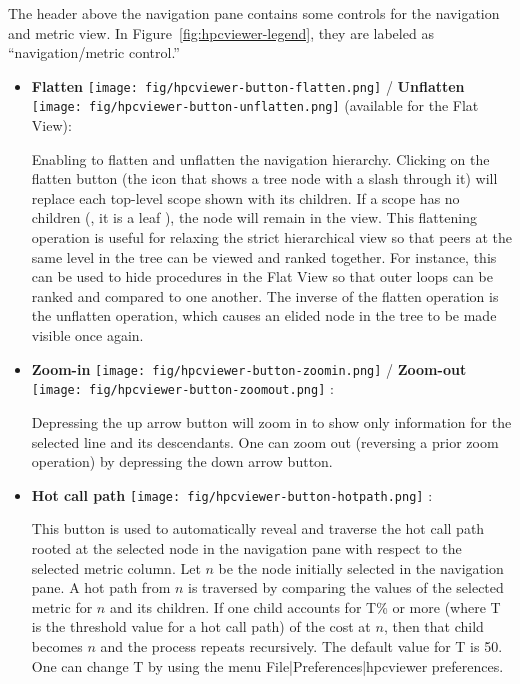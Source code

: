 The header above the navigation pane contains some controls for the navigation and metric view.
In Figure~\ref{fig:hpcviewer-legend}, they are labeled as ``navigation/metric control.''
\begin{itemize}

\item \textbf{Flatten} \texttt{[image: fig/hpcviewer-button-flatten.png]} /
      \textbf{Unflatten} \texttt{[image: fig/hpcviewer-button-unflatten.png]}
      (available for the Flat View):

Enabling to flatten and unflatten the navigation hierarchy.
Clicking on the flatten button (the icon that shows a tree node with a slash through it) will replace each top-level scope shown with its children.
If a scope has no children (\ie{}, it is a leaf ), the node will remain in the view.
This flattening operation is useful for relaxing the strict hierarchical view so that peers at the same level in the tree can be viewed and ranked together.
For instance, this can be used to hide procedures in the Flat View so that outer loops can be ranked and compared to one another.
The inverse of the flatten operation is the unflatten operation, which causes an elided node in the tree to be made visible once again.

\item \textbf{Zoom-in} \texttt{[image: fig/hpcviewer-button-zoomin.png]} /
      \textbf{Zoom-out} \texttt{[image: fig/hpcviewer-button-zoomout.png]} :

Depressing the up arrow button will zoom in to show only information for the selected line and its descendants.
One can zoom out (reversing a prior zoom operation) by depressing the down arrow button.

\item \textbf{Hot call path} \texttt{[image: fig/hpcviewer-button-hotpath.png]} :

This button is used to automatically reveal and traverse the hot call path rooted at the selected node in the navigation pane with respect to the selected metric column. Let $n$ be the node initially selected in the navigation pane.
A hot path from $n$  is traversed by comparing the values of the selected metric for $n$ and its children. If one child accounts for T\% or more (where T is the threshold value for a hot call path) of the cost at $n$,  then that child becomes $n$ and the process repeats recursively. The default value for T is 50. One can change T by using the menu File|Preferences|hpcviewer preferences.


\end{itemize}

